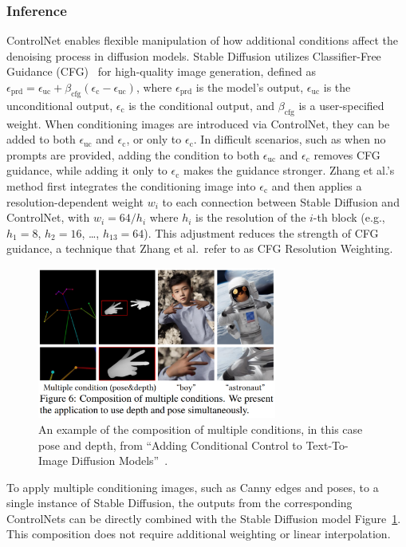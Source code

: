 \subsubsection{Inference}
ControlNet enables flexible manipulation of how additional conditions affect the denoising process in diffusion models. Stable Diffusion utilizes Classifier-Free Guidance (CFG)~\cite{ho2022classifierfreediffusionguidance} for high-quality image generation, defined as \(\epsilon_{\text{prd}} = \epsilon_{\text{uc}} + \beta_{\text{cfg}} (\epsilon_{\text{c}} - \epsilon_{\text{uc}})\), where \(\epsilon_{\text{prd}}\) is the model's output, \(\epsilon_{\text{uc}}\) is the unconditional output, \(\epsilon_{\text{c}}\) is the conditional output, and \(\beta_{\text{cfg}}\) is a user-specified weight. When conditioning images are introduced via ControlNet, they can be added to both \(\epsilon_{\text{uc}}\) and \(\epsilon_{\text{c}}\), or only to \(\epsilon_{\text{c}}\). In difficult scenarios, such as when no prompts are provided, adding the condition to both \(\epsilon_{\text{uc}}\) and \(\epsilon_{\text{c}}\) removes CFG guidance, while adding it only to \(\epsilon_{\text{c}}\) makes the guidance stronger. Zhang et al.'s~\cite{zhang2023addingconditionalcontroltexttoimage} method first integrates the conditioning image into \(\epsilon_{\text{c}}\) and then applies a resolution-dependent weight \(w_i\) to each connection between Stable Diffusion and ControlNet, with \(w_i = 64/h_i\) where \(h_i\) is the resolution of the \(i\)-th block (e.g., \(h_1 = 8\), \(h_2 = 16\), \ldots, \(h_{13} = 64\)). This adjustment reduces the strength of CFG guidance, a technique that Zhang et al.\ refer to as CFG Resolution Weighting.
\begin{figure}[h!]
    \centering
    \includegraphics[width=0.7\textwidth]{assets/control_net_composition.pdf}
    \caption{An example of the composition of multiple conditions, in this case pose and depth, from ``Adding Conditional Control to Text-To-Image Diffusion Models''~\cite{zhang2023addingconditionalcontroltexttoimage}.}
    \label{fig:control_net:composition}
\end{figure}
To apply multiple conditioning images, such as Canny edges and poses, to a single instance of Stable Diffusion, the outputs from the corresponding ControlNets can be directly combined with the Stable Diffusion model Figure~\ref{fig:control_net:composition}. This composition does not require additional weighting or linear interpolation.
